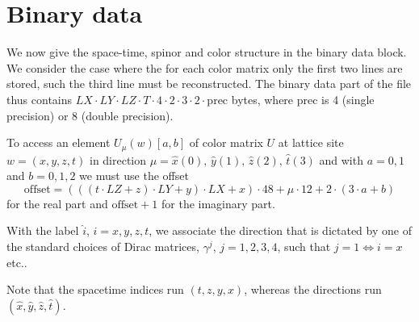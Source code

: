 \section{Binary data}

We now give the space-time, spinor and color structure in the binary data block.
We consider the case where the for each color matrix only the first two lines are stored, such the third line must
be reconstructed. The binary data part of the file thus contains 
$LX\cdot LY\cdot LZ\cdot T\cdot 4 \cdot 2 \cdot 3 \cdot 2 \cdot \mathrm{prec}$ bytes, where prec is 4 (single precision) or
8 (double precision).


To access an element $U_\mu(w)[a,b]$ of color matrix $U$ at lattice site $w = (x,y,z,t)$ in direction 
$\mu=\hat{x}(0),\,\hat{y}(1),\,\hat{z}(2),\,\hat{t}(3)$ and with $a=0,1$ and $b=0,1,2$ we must use the offset
\begin{equation}
  \mathrm{offset} = ( ( ( t\cdot LZ + z ) \cdot LY + y ) \cdot LX + x ) \cdot 48 + \mu\cdot 12 + 2\cdot (3\cdot a + b)
\end{equation}
for the real part and $\mathrm{offset}+1$ for the imaginary part.

With the label $\hat{i}$, $i=x,y,z,t$, we associate the direction that is dictated by one of the standard choices
of Dirac matrices, $\gamma^{j}$, $j=1,2,3,4$, such that $j=1 \Leftrightarrow i=x$ etc..

Note that the spacetime indices run $(t,z,y,x)$, whereas the directions run $(\hat{x},\hat{y},\hat{z},\hat{t})$.
